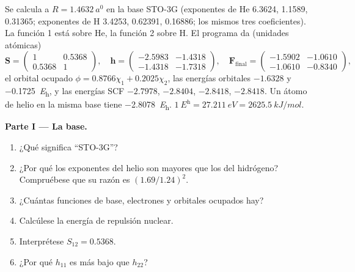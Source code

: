 \begin{problem}
\label{pb:b3:computational-chemistry:1}
Se calcula  a $R = \qty{1.4632}{\bohr}$ en la base STO-3G (exponentes de He
6.3624, 1.1589, 0.31365; exponentes de H 3.4253, 0.62391, 0.16886; los
mismos tres coeficientes). La función 1 está sobre He, la función 2 sobre H. El programa
da (unidades atómicas)
\[
\mathbf S = \begin{pmatrix}1 & 0.5368\\ 0.5368 & 1\end{pmatrix},\quad
\mathbf h = \begin{pmatrix}-2.5983 & -1.4318\\ -1.4318 & -1.7318\end{pmatrix},\quad
\mathbf F_{\mathrm{final}} = \begin{pmatrix}-1.5902 & -1.0610\\ -1.0610 & -0.8340
\end{pmatrix},
\]
el orbital ocupado $\phi = 0.8766\chi_1 + 0.2025\chi_2$, las energías orbitales
$-1.6328$ y \qty{-0.1725}{\hartree}, y las energías SCF $-2.7978$, $-2.8404$,
$-2.8418$, $-2.8418$. Un átomo de helio en la misma base tiene
\qty{-2.8078}{\hartree}. $\qty{1}{\hartree} = \qty{27.211}{eV} =
\qty{2625.5}{kJ/mol}$.

\medskip\noindent\textbf{Parte I --- La base.}
\begin{enumerate}
  \item ¿Qué significa ``STO-3G''?
  \item ¿Por qué los exponentes del helio son mayores que los del hidrógeno? Compruébese
        que su razón es $(1.69/1.24)^2$.
  \item ¿Cuántas funciones de base, electrones y orbitales ocupados hay?
  \item Calcúlese la energía de repulsión nuclear.
  \item Interprétese $S_{12} = 0.5368$.
  \item ¿Por qué $h_{11}$ es más bajo que $h_{22}$?
\end{enumerate}


\end{problem}
